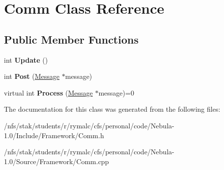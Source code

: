 \hypertarget{classComm}{
\section{Comm Class Reference}
\label{classComm}
}
\subsection*{Public Member Functions}
\begin{DoxyCompactItemize}
\item 
\hypertarget{classComm_ae5e06d5c6e6a593780d01b14373e4117}{
int {\bfseries Update} ()}
\label{classComm_ae5e06d5c6e6a593780d01b14373e4117}

\item 
\hypertarget{classComm_ad622a4712ffe5a5ba55b8d2abfaa454d}{
int {\bfseries Post} (\hyperlink{structMessage}{Message} $\ast$message)}
\label{classComm_ad622a4712ffe5a5ba55b8d2abfaa454d}

\item 
\hypertarget{classComm_af4ea8117da1bbefdba3a91ae4db119f9}{
virtual int {\bfseries Process} (\hyperlink{structMessage}{Message} $\ast$message)=0}
\label{classComm_af4ea8117da1bbefdba3a91ae4db119f9}

\end{DoxyCompactItemize}


The documentation for this class was generated from the following files:\begin{DoxyCompactItemize}
\item 
/nfs/stak/students/r/rymalc/cfs/personal/code/Nebula-\/1.0/Include/Framework/Comm.h\item 
/nfs/stak/students/r/rymalc/cfs/personal/code/Nebula-\/1.0/Source/Framework/Comm.cpp\end{DoxyCompactItemize}
